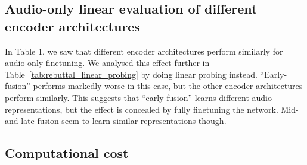 \documentclass[10pt,twocolumn,letterpaper]{article}
\begin{document}
\subsection{Audio-only linear evaluation of different encoder architectures}
\begin{table}[t]
	\caption{Comparison of different pretraining architectures. We show audio-only downstream evaluation on VGGSound. }
	\centering
	\label{tab:rebuttal_linear_probing}
\end{table} 
In Table 1, we saw that different encoder architectures perform similarly for audio-only finetuning.
We analysed this effect further in Table~\ref{tab:rebuttal_linear_probing} by doing linear probing instead.
``Early-fusion'' performs markedly worse in this case, but the other encoder architectures perform similarly.
This suggests that ``early-fusion'' learns different audio representations, but the effect is concealed by fully finetuning the network.
Mid- and late-fusion seem to learn similar representations though.



\subsection{Computational cost}
\end{document}
